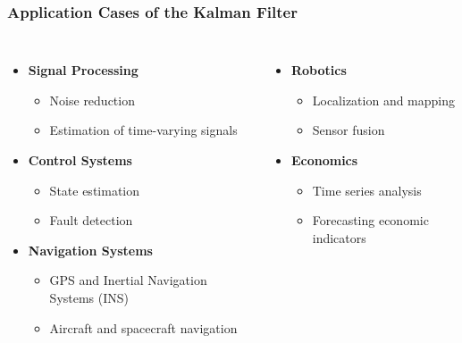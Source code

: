 \documentclass[aspectratio=169]{beamer}
\begin{document}
\begin{frame}
    \frametitle{Application Cases of the Kalman Filter}
    \begin{columns}[T]
        \begin{itemize}
            \item \textbf{Signal Processing}
                  \begin{itemize}
                      \item Noise reduction
                      \item Estimation of time-varying signals
                  \end{itemize}
            \item \textbf{Control Systems}
                  \begin{itemize}
                      \item State estimation
                      \item Fault detection
                  \end{itemize}
            \item \textbf{Navigation Systems}
                  \begin{itemize}
                      \item GPS and Inertial Navigation Systems (INS)
                      \item Aircraft and spacecraft navigation
                  \end{itemize}

        \end{itemize}
        \begin{itemize}
            \item \textbf{Robotics}
                  \begin{itemize}
                      \item Localization and mapping
                      \item Sensor fusion
                  \end{itemize}
            \item \textbf{Economics}
                  \begin{itemize}
                      \item Time series analysis
                      \item Forecasting economic indicators
                  \end{itemize}
        \end{itemize}
    \end{columns}
\end{frame}
\end{document}
